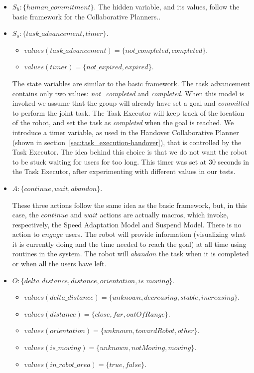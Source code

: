 \begin{itemize}
	\item $S_h:\{human\_commitment\}$.
		The hidden variable, and its values, follow the basic framework for the Collaborative Planners..
	\item $S_o:\{task\_advancement, timer\}$.
		\begin{itemize}
			\item $values(task\_advancement)=\{not\_completed,completed\}$.
			\item $values(timer)=\{not\_expired,expired\}$.
		\end{itemize}

		The state variables are similar to the basic framework. The task advancement contains only two values: \textit{not\_completed} and \textit{completed}. When this model is invoked we assume that the group will already have set a goal and \textit{committed} to perform the joint task.
		The Task Executor will keep track of the location of the robot, and set the task as \textit{completed} when the goal is reached.
		We introduce a timer variable, as used in the Handover Collaborative Planner (shown in section~\ref{sec:task_execution-handover}), that is controlled by the Task Executor. The idea behind this choice is that we do not want the robot to be stuck waiting for users for too long. This timer was set at 30 seconds in the Task Executor, after experimenting with different values in our tests.

	\item $A:\{continue,wait,abandon\}$.

		These three actions follow the same idea as the basic framework, but, in this case, the $continue$ and $wait$ actions are actually macros, which invoke, respectively, the Speed Adaptation Model and Suspend Model. There is no action to $engage$ users. The robot will provide information (visualizing what it is currently doing and the time needed to reach the goal) at all time using routines in the system.
		The robot will $abandon$ the task when it is completed or when all the users have left.

	\item $O:\{delta\_distance,distance,orientation,is\_moving\}$.
		\begin{itemize}
			\item $values(delta\_distance)=\{unknown, decreasing,stable,increasing\}$.
			\item $values(distance)=\{close,far,outOfRange\}$.
			\item $values(orientation)=\{unknown,towardRobot,other\}$.
			\item $values(is\_moving)=\{unknown,notMoving,moving\}$.
			\item $values(in\_robot\_area)=\{true,false\}$.
		\end{itemize}


\end{itemize}
